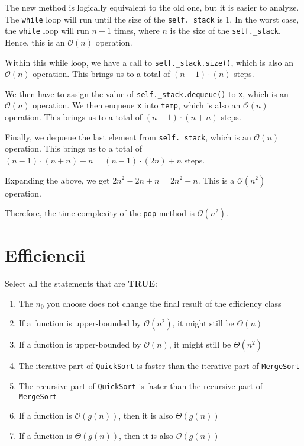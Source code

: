 \documentclass{article}
\begin{document}
The new method is logically equivalent to the old one, but it is easier to analyze. The \texttt{while} loop will run until the size of the \texttt{self.\_stack} is 1. In the worst case, the \texttt{while} loop will run $n-1$ times, where $n$ is the size of the \texttt{self.\_stack}. Hence, this is an $\mathcal{O}(n)$ operation.

Within this while loop, we have a call to \texttt{self.\_stack.size()}, which is also an $\mathcal{O}(n)$ operation. This brings us to a total of $(n - 1) \cdot (n)$ steps. 

We then have to assign the value of \texttt{self.\_stack.dequeue()} to \texttt{x}, which is an $\mathcal{O}(n)$ operation. We then enqueue \texttt{x} into \texttt{temp}, which is also an $\mathcal{O}(n)$ operation. This brings us to a total of $(n - 1) \cdot (n + n)$ steps.

Finally, we dequeue the last element from \texttt{self.\_stack}, which is an $\mathcal{O}(n)$ operation. This brings us to a total of $(n - 1) \cdot (n + n) + n = (n - 1) \cdot (2n) + n $ steps.

Expanding the above, we get $2n^2 - 2n + n = 2n^2 - n$. This is a $\mathcal{O}(n^2)$ operation.

Therefore, the time complexity of the \texttt{pop} method is $\mathcal{O}(n^2)$.

\section{Efficiencii}

Select all the statements that are \textbf{TRUE}:
  \begin{enumerate}
    \item The $n_0$ you choose does not change the final result of the efficiency class
    \item If a function is upper-bounded by $\mathcal{O}(n^2)$, it might still be $\Theta(n)$
    \item If a function is upper-bounded by $\mathcal{O}(n)$, it might still be $\Theta(n^2)$
    \item The iterative part of \texttt{QuickSort} is faster than the iterative part of \texttt{MergeSort}
    \item The recursive part of \texttt{QuickSort} is faster than the recursive part of \texttt{MergeSort}
    \item If a function is $\mathcal{O}(g(n))$, then it is also $\Theta(g(n))$
    \item If a function is $\Theta(g(n))$, then it is also $\mathcal{O}(g(n))$
\end{enumerate}
\end{document}
